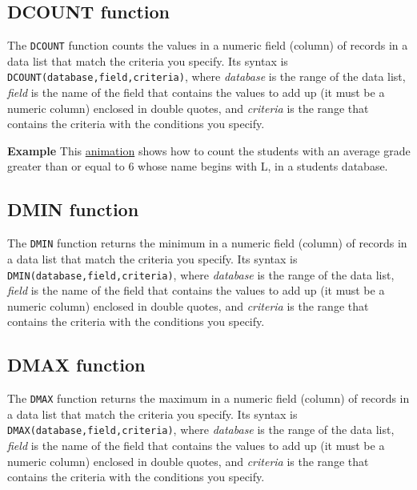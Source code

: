 \subsection{DCOUNT function}\hypertarget{dcount-function}{}\label{dcount-function}

The \texttt{DCOUNT} function counts the values in a numeric field (column) of records in a data list that match the criteria you specify. Its syntax is \texttt{DCOUNT(database,field,criteria)}, where \emph{database} is the range of the data list, \emph{field} is the name of the field that contains the values to add up (it must be a numeric column) enclosed in double quotes, and \emph{criteria} is the range that contains the criteria with the conditions you specify.

\textbf{Example} This \href{http://aprendeconalf.es/office/excel/manual/img/example_function_dcount.gif}{animation} shows how to count the students with an average grade greater than or equal to 6 whose name begins with L, in a students database.

\subsection{DMIN function}\hypertarget{dmin-function}{}\label{dmin-function}

The \texttt{DMIN} function returns the minimum in a numeric field (column) of records in a data list that match the criteria you specify. Its syntax is \texttt{DMIN(database,field,criteria)}, where \emph{database} is the range of the data list, \emph{field} is the name of the field that contains the values to add up (it must be a numeric column) enclosed in double quotes, and \emph{criteria} is the range that contains the criteria with the conditions you specify.

\subsection{DMAX function}\hypertarget{dmax-function}{}\label{dmax-function}

The \texttt{DMAX} function returns the maximum in a numeric field (column) of records in a data list that match the criteria you specify. Its syntax is \texttt{DMAX(database,field,criteria)}, where \emph{database} is the range of the data list, \emph{field} is the name of the field that contains the values to add up (it must be a numeric column) enclosed in double quotes, and \emph{criteria} is the range that contains the criteria with the conditions you specify.

